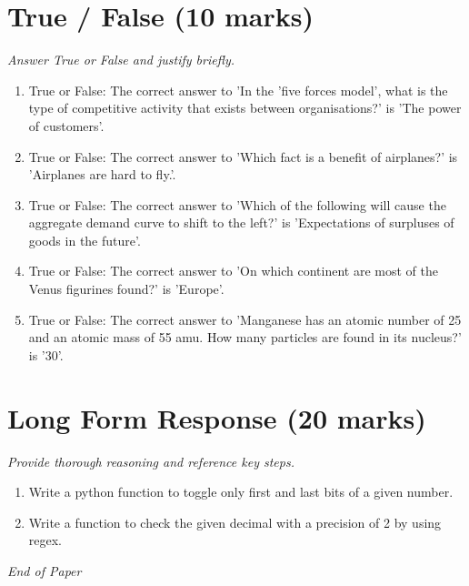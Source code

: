 \documentclass[12pt]{article}
\begin{document}
\section*{True / False (10 marks)}
\textit{Answer True or False and justify briefly.}
\begin{enumerate}[label=\arabic*.]
\item True or False: The correct answer to 'In the 'five forces model', what is the type of competitive activity that exists between organisations?' is 'The power of customers'.
\item True or False: The correct answer to 'Which fact is a benefit of airplanes?' is 'Airplanes are hard to fly.'.
\item True or False: The correct answer to 'Which of the following will cause the aggregate demand curve to shift to the left?' is 'Expectations of surpluses of goods in the future'.
\item True or False: The correct answer to 'On which continent are most of the Venus figurines found?' is 'Europe'.
\item True or False: The correct answer to 'Manganese has an atomic number of 25 and an atomic mass of 55 amu. How many particles are found in its nucleus?' is '30'.
\end{enumerate}

\section*{Long Form Response (20 marks)}
\textit{Provide thorough reasoning and reference key steps.}
\begin{enumerate}[label=\arabic*.]
\item Write a python function to toggle only first and last bits of a given number.
\item Write a function to check the given decimal with a precision of 2 by using regex.
\end{enumerate}

\vfill
\noindent\textit{End of Paper}
\end{document}
